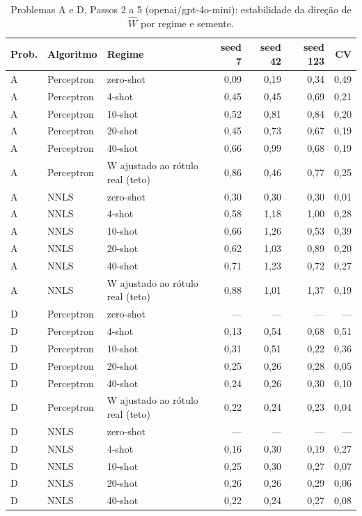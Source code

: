 \begin{table}[htbp]
\centering
\small
\caption{Problemas A e D, Passos 2 a 5 (openai/gpt-4o-mini): estabilidade da direção de $\hat{W}$ por regime e semente.}
\label{tab:AD_passo4_estabilidade_W_gpt4mini}
\begin{tabular}{lllrrrr}
\toprule
Prob. & Algoritmo & Regime & seed 7 & seed 42 & seed 123 & CV \\
\midrule
A & Perceptron & zero-shot & 0,09 & 0,19 & 0,34 & 0,49 \\
A & Perceptron & 4-shot & 0,45 & 0,45 & 0,69 & 0,21 \\
A & Perceptron & 10-shot & 0,52 & 0,81 & 0,84 & 0,20 \\
A & Perceptron & 20-shot & 0,45 & 0,73 & 0,67 & 0,19 \\
A & Perceptron & 40-shot & 0,66 & 0,99 & 0,68 & 0,19 \\
A & Perceptron & W ajustado ao rótulo real (teto) & 0,86 & 0,46 & 0,77 & 0,25 \\
\midrule
A & NNLS & zero-shot & 0,30 & 0,30 & 0,30 & 0,01 \\
A & NNLS & 4-shot & 0,58 & 1,18 & 1,00 & 0,28 \\
A & NNLS & 10-shot & 0,66 & 1,26 & 0,53 & 0,39 \\
A & NNLS & 20-shot & 0,62 & 1,03 & 0,89 & 0,20 \\
A & NNLS & 40-shot & 0,71 & 1,23 & 0,72 & 0,27 \\
A & NNLS & W ajustado ao rótulo real (teto) & 0,88 & 1,01 & 1,37 & 0,19 \\
\midrule
D & Perceptron & zero-shot & — & — & — & — \\
D & Perceptron & 4-shot & 0,13 & 0,54 & 0,68 & 0,51 \\
D & Perceptron & 10-shot & 0,31 & 0,51 & 0,22 & 0,36 \\
D & Perceptron & 20-shot & 0,25 & 0,26 & 0,28 & 0,05 \\
D & Perceptron & 40-shot & 0,24 & 0,26 & 0,30 & 0,10 \\
D & Perceptron & W ajustado ao rótulo real (teto) & 0,22 & 0,24 & 0,23 & 0,04 \\
\midrule
D & NNLS & zero-shot & — & — & — & — \\
D & NNLS & 4-shot & 0,16 & 0,30 & 0,19 & 0,27 \\
D & NNLS & 10-shot & 0,25 & 0,30 & 0,27 & 0,07 \\
D & NNLS & 20-shot & 0,26 & 0,26 & 0,29 & 0,06 \\
D & NNLS & 40-shot & 0,22 & 0,24 & 0,27 & 0,08 \\

\end{tabular}
\end{table}
